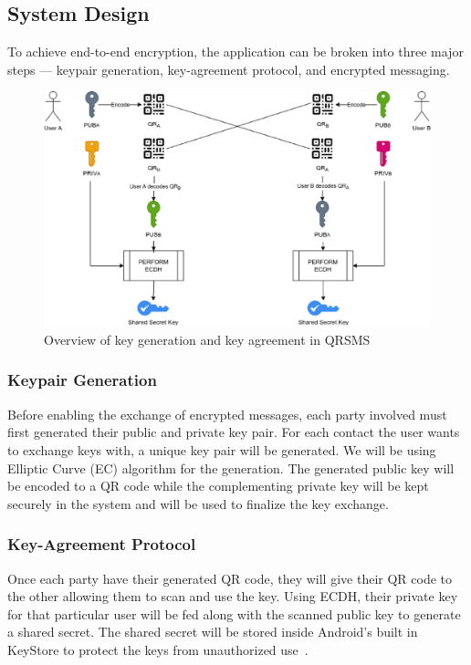 \documentclass[journal]{./IEEE/IEEEtran}
\begin{document}
\subsection{System Design}
To achieve end-to-end encryption, the application can be broken into three
major steps --- keypair generation, key-agreement protocol, and
encrypted messaging.
\begin{figure}
    \centering
    \includegraphics[width=6in]{images/key_agreement.eps}
    \caption{Overview of key generation and key agreement in QRSMS}
    \label{key_genagree}
\end{figure}

\subsubsection{Keypair Generation}
Before enabling the exchange of encrypted messages, each party involved
must first generated their public and private key pair. For each contact the
user wants to exchange keys with, a unique key pair will be generated.
We will be using Elliptic Curve (EC) algorithm for the generation.
The generated public key will be encoded to a QR code while the complementing
private key will be kept securely in the system and will be used to finalize
the key exchange.

\subsubsection{Key-Agreement Protocol}
Once each party have their generated QR code, they will give their QR code to
the other allowing them to scan and use the key. Using ECDH, their private key
for that particular user will be fed along with the scanned public key to
generate a shared secret. The shared secret will be stored inside Android's
built in KeyStore to protect the keys from unauthorized use~\cite{android_keystore}.
\end{document}
